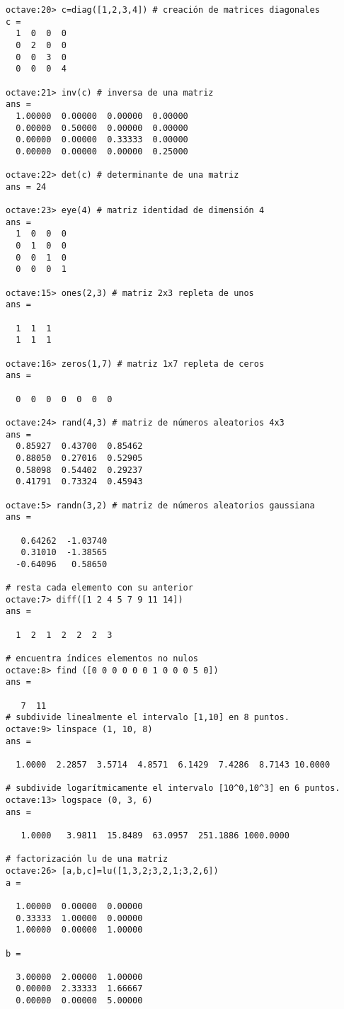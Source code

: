 \begin{verbatim}
octave:20> c=diag([1,2,3,4]) # creación de matrices diagonales
c =
  1  0  0  0
  0  2  0  0
  0  0  3  0
  0  0  0  4

octave:21> inv(c) # inversa de una matriz
ans =
  1.00000  0.00000  0.00000  0.00000
  0.00000  0.50000  0.00000  0.00000
  0.00000  0.00000  0.33333  0.00000
  0.00000  0.00000  0.00000  0.25000

octave:22> det(c) # determinante de una matriz
ans = 24

octave:23> eye(4) # matriz identidad de dimensión 4
ans =
  1  0  0  0
  0  1  0  0
  0  0  1  0
  0  0  0  1

octave:15> ones(2,3) # matriz 2x3 repleta de unos
ans =

  1  1  1
  1  1  1

octave:16> zeros(1,7) # matriz 1x7 repleta de ceros
ans =

  0  0  0  0  0  0  0

octave:24> rand(4,3) # matriz de números aleatorios 4x3
ans =
  0.85927  0.43700  0.85462
  0.88050  0.27016  0.52905
  0.58098  0.54402  0.29237
  0.41791  0.73324  0.45943

octave:5> randn(3,2) # matriz de números aleatorios gaussiana
ans =

   0.64262  -1.03740
   0.31010  -1.38565
  -0.64096   0.58650

# resta cada elemento con su anterior
octave:7> diff([1 2 4 5 7 9 11 14]) 
ans =

  1  2  1  2  2  2  3

# encuentra índices elementos no nulos
octave:8> find ([0 0 0 0 0 0 1 0 0 0 5 0]) 
ans =

   7  11
# subdivide linealmente el intervalo [1,10] en 8 puntos.
octave:9> linspace (1, 10, 8) 
ans =

  1.0000  2.2857  3.5714  4.8571  6.1429  7.4286  8.7143 10.0000

# subdivide logarítmicamente el intervalo [10^0,10^3] en 6 puntos.
octave:13> logspace (0, 3, 6) 
ans =

   1.0000   3.9811  15.8489  63.0957  251.1886 1000.0000

# factorización lu de una matriz
octave:26> [a,b,c]=lu([1,3,2;3,2,1;3,2,6]) 
a =

  1.00000  0.00000  0.00000
  0.33333  1.00000  0.00000
  1.00000  0.00000  1.00000

b =

  3.00000  2.00000  1.00000
  0.00000  2.33333  1.66667
  0.00000  0.00000  5.00000


\end{verbatim}
